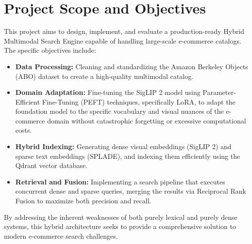 \documentclass[12pt, a4paper]{article}
\begin{document}
\section{Project Scope and Objectives}
This project aims to design, implement, and evaluate a production-ready Hybrid Multimodal Search Engine capable of handling large-scale e-commerce catalogs. The specific objectives include:
\begin{itemize}
    \item \textbf{Data Processing:} Cleaning and standardizing the Amazon Berkeley Objects (ABO) dataset to create a high-quality multimodal catalog.
    \item \textbf{Domain Adaptation:} Fine-tuning the SigLIP 2 model using Parameter-Efficient Fine-Tuning (PEFT) techniques, specifically LoRA, to adapt the foundation model to the specific vocabulary and visual nuances of the e-commerce domain without catastrophic forgetting or excessive computational costs.
    \item \textbf{Hybrid Indexing:} Generating dense visual embeddings (SigLIP 2) and sparse text embeddings (SPLADE), and indexing them efficiently using the Qdrant vector database.
    \item \textbf{Retrieval and Fusion:} Implementing a search pipeline that executes concurrent dense and sparse queries, merging the results via Reciprocal Rank Fusion to maximize both precision and recall.
\end{itemize}

By addressing the inherent weaknesses of both purely lexical and purely dense systems, this hybrid architecture seeks to provide a comprehensive solution to modern e-commerce search challenges.
\end{document}
